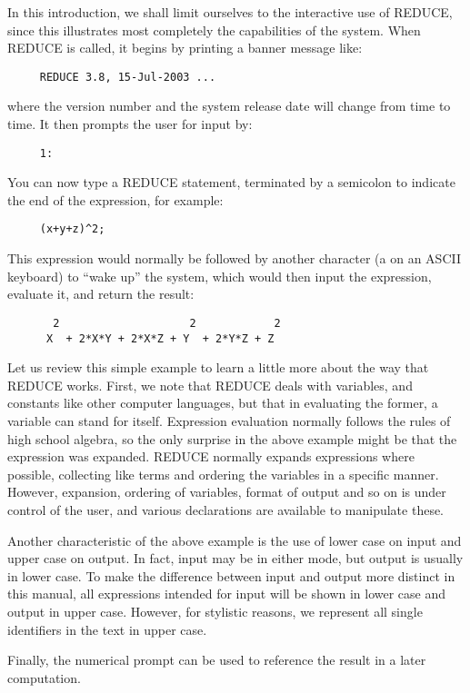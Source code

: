 \documentclass[11pt,letterpaper]{book}
\newcommand{\REDUCE}{REDUCE}
\newcommand{\key}[1]{\fbox{\sf #1}}
\begin{document}
In this introduction, we shall limit ourselves to the interactive use of
{\REDUCE}, since this illustrates most completely the capabilities of the
system. When {\REDUCE} is called, it begins by printing a banner message
like:
{\small\begin{verbatim}
     REDUCE 3.8, 15-Jul-2003 ...
\end{verbatim}}
where the version number and the system release date will change from time
to time. It then prompts the user for input by:
{\small\begin{verbatim}
     1:
\end{verbatim}}
You can now type a {\REDUCE} statement, terminated by a semicolon to indicate
the end of the expression, for example:
{\small\begin{verbatim}
     (x+y+z)^2;
\end{verbatim}}
This expression would normally be followed by another character (a
\key{Return} on an ASCII keyboard) to ``wake up'' the system, which would
then input the expression, evaluate it, and return the result:
{\small\begin{verbatim}
       2                    2            2
      X  + 2*X*Y + 2*X*Z + Y  + 2*Y*Z + Z
\end{verbatim}}
Let us review this simple example to learn a little more about the way that
{\REDUCE} works. First, we note that {\REDUCE} deals with variables, and
constants like other computer languages, but that in evaluating the former,
a variable can stand for itself. Expression evaluation normally follows
the rules of high school algebra, so the only surprise in the above example
might be that the expression was expanded. {\REDUCE} normally expands
expressions where possible, collecting like terms and ordering the
variables in a specific manner. However, expansion, ordering of variables,
format of output and so on is under control of the user, and various
declarations are available to manipulate these.

Another characteristic of the above example is the use of lower case on
input and upper case on output.  In fact, input may be in either mode, but
output is usually in lower case.  To make the difference between input and
output more distinct in this manual, all expressions intended for input
will be shown in lower case and output in upper case.  However, for
stylistic reasons, we represent all single identifiers in the text in
upper case.

Finally, the numerical prompt can be used to reference the result in a
later computation.
\end{document}
